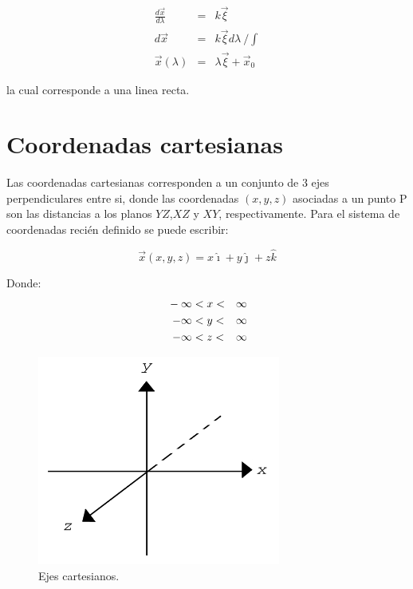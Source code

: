 \documentclass[12pt]{report}
\begin{document}
\begin{eqnarray} \nonumber
\frac{d\vec{x}}{d\lambda} &=& k\vec{\xi} \\ \nonumber
d\vec{x} &=& k\vec{\xi} d\lambda \ \displaystyle / \int \\ 
\vec{x}(\lambda) &=& \lambda\vec{\xi} + \vec{x}_0 \label{2.5}
\end{eqnarray}

la cual corresponde a una linea recta.












\section{Coordenadas cartesianas}

Las coordenadas cartesianas corresponden a un conjunto de 3 ejes perpendiculares entre si, donde las coordenadas $(x,y,z)$ asociadas a un punto P son las distancias a los planos $YZ$,$XZ$ y $XY$, respectivamente. Para el sistema de coordenadas recién definido se puede escribir: 

\begin{equation} \label{2.6}
\vec{x}(x,y,z)= x\hat{\imath}+y\hat{\jmath}+z\hat{k} 
\end{equation}

Donde:  \\

\begin{eqnarray}{\nonumber}
-\infty&<x<&\infty \\
\nonumber
-\infty&<y<&\infty\\
\nonumber
-\infty&<z<&\infty
\end{eqnarray}



\begin{figure}[H]
	\centering
	\includegraphics[width=8cm]{figura2.png}
	\caption{ Ejes cartesianos.}
	\label{fig.1}
\end{figure}
\end{document}
